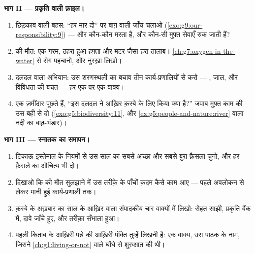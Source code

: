 \begin{problem}[{सप्ताहांत समस्या --- किसी क़स्बे का एक साल, पूरी किताब
से जाँचा हुआ}]
\medskip\noindent\textbf{भाग II --- प्रकृति वाली फ़ाइल।}
\begin{enumerate}[resume]
  \item छिड़काव वाली बहस: ``हर  मार दो'' पर बाग़ वाली जाँच चलाओ
        (\cref{exo:g9:our-responsibility:9}) --- और कौन-कौन मरता है,
        और कौन-सी मुफ़्त सेवाएँ रुक जाती हैं?
  \item {} की मौत: एक गरम, ठहरा हुआ हफ़्ता और मटर जैसा हरा
        तालाब। \cref{ch:g7:oxygen-in-the-water} से रोग पहचानो, और
        नुस्ख़ा लिखो।
  \item दलदल वाला अभियान: उस शरणस्थली का बचाव तीन कार्य-प्रणालियों से
        करो --- , जाल, और विविधता की बचत --- हर एक पर एक वाक्य।
  \item एक ज़मींदार पूछते हैं, ``इस दलदल ने आख़िर क़स्बे के लिए किया
        क्या है?'' जवाब मुफ़्त काम की उस बही से दो
        (\cref{exo:g5:biodiversity:11}, और
        \cref{ex:g5:people-and-nature:river} वाला नदी का बाढ़-भंडार)।
\end{enumerate}

\medskip\noindent\textbf{भाग III --- स्नातक का समापन।}
\begin{enumerate}[resume]
  \item टिकाऊ इस्तेमाल के नियमों से उस साल का सबसे अच्छा और सबसे बुरा
        फ़ैसला चुनो, और हर फ़ैसले का औचित्य भी दो।
  \item दिखाओ कि  की मौत सुलझाने में उस तरीक़े के पाँचों क़दम
        कैसे काम आए --- पहले अवलोकन से लेकर मानी हुई कार्य-प्रणाली
        तक।
  \item क़स्बे के अख़बार का साल के आख़िर वाला संपादकीय चार वाक्यों में
        लिखो: सेहत साझी, प्रकृति बैंक में, दावे जाँचे हुए, और तरीक़ा
        सँभाला हुआ।
  \item पहली किताब के आख़िरी पन्ने की आख़िरी पंक्ति तुम्हें लिखनी है:
        एक वाक्य, उस पाठक के नाम, जिसने \cref{ch:g1:living-or-not}
        वाले घोंघे से शुरुआत की थी।
\end{enumerate}
\end{problem}
